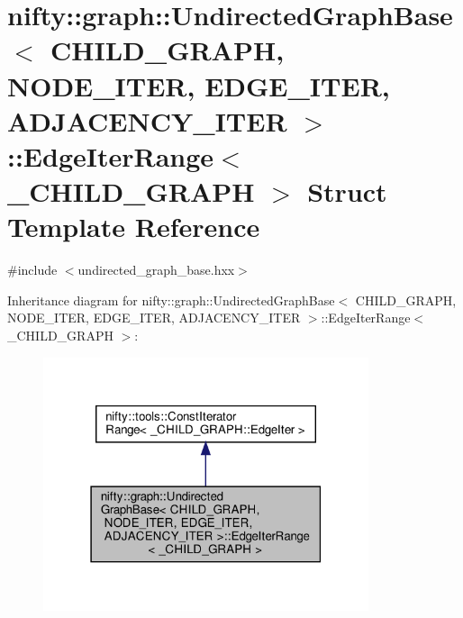 \hypertarget{structnifty_1_1graph_1_1UndirectedGraphBase_1_1EdgeIterRange}{}\section{nifty\+:\+:graph\+:\+:Undirected\+Graph\+Base$<$ C\+H\+I\+L\+D\+\_\+\+G\+R\+A\+PH, N\+O\+D\+E\+\_\+\+I\+T\+ER, E\+D\+G\+E\+\_\+\+I\+T\+ER, A\+D\+J\+A\+C\+E\+N\+C\+Y\+\_\+\+I\+T\+ER $>$\+:\+:Edge\+Iter\+Range$<$ \+\_\+\+C\+H\+I\+L\+D\+\_\+\+G\+R\+A\+PH $>$ Struct Template Reference}
\label{structnifty_1_1graph_1_1UndirectedGraphBase_1_1EdgeIterRange}


{\ttfamily \#include $<$undirected\+\_\+graph\+\_\+base.\+hxx$>$}



Inheritance diagram for nifty\+:\+:graph\+:\+:Undirected\+Graph\+Base$<$ C\+H\+I\+L\+D\+\_\+\+G\+R\+A\+PH, N\+O\+D\+E\+\_\+\+I\+T\+ER, E\+D\+G\+E\+\_\+\+I\+T\+ER, A\+D\+J\+A\+C\+E\+N\+C\+Y\+\_\+\+I\+T\+ER $>$\+:\+:Edge\+Iter\+Range$<$ \+\_\+\+C\+H\+I\+L\+D\+\_\+\+G\+R\+A\+PH $>$\+:
\nopagebreak
\begin{figure}[H]
\begin{center}
\leavevmode
\includegraphics[width=271pt]{structnifty_1_1graph_1_1UndirectedGraphBase_1_1EdgeIterRange__inherit__graph}
\end{center}
\end{figure}


